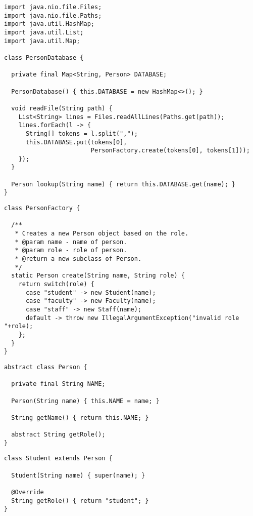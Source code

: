 \enlargethispage{-4\baselineskip}
\begin{lstlisting}[language=MyJava]
import java.nio.file.Files;
import java.nio.file.Paths;
import java.util.HashMap;
import java.util.List;
import java.util.Map;

class PersonDatabase {

  private final Map<String, Person> DATABASE;

  PersonDatabase() { this.DATABASE = new HashMap<>(); }

  void readFile(String path) {
    List<String> lines = Files.readAllLines(Paths.get(path));
    lines.forEach(l -> {
      String[] tokens = l.split(",");
      this.DATABASE.put(tokens[0], 
                        PersonFactory.create(tokens[0], tokens[1]));
    });
  }

  Person lookup(String name) { return this.DATABASE.get(name); }
}
\end{lstlisting}

\begin{lstlisting}[language=MyJava]
class PersonFactory {
  
  /**
   * Creates a new Person object based on the role.
   * @param name - name of person.
   * @param role - role of person.
   * @return a new subclass of Person.
   */
  static Person create(String name, String role) {
    return switch(role) {
      case "student" -> new Student(name);
      case "faculty" -> new Faculty(name);
      case "staff" -> new Staff(name);
      default -> throw new IllegalArgumentException("invalid role "+role);
    };
  }
}
\end{lstlisting}

\enlargethispage{1\baselineskip}
\begin{lstlisting}[language=MyJava]
abstract class Person {

  private final String NAME;

  Person(String name) { this.NAME = name; }

  String getName() { return this.NAME; }

  abstract String getRole();
}
\end{lstlisting}

\begin{lstlisting}[language=MyJava]
class Student extends Person {

  Student(String name) { super(name); }

  @Override
  String getRole() { return "student"; }
}
\end{lstlisting}


